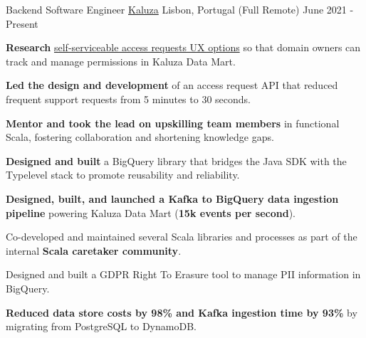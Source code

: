 
\begin{cventries}
  \vspace{-2mm}
  \cventry
    {Backend Software Engineer}
    {\href{https://www.kaluza.com/}{Kaluza}}
    {Lisbon, Portugal (Full Remote)}
    {June 2021 - Present}
    {
      \begin{cvitems}
        \item \textbf{Research} \href{https://raw.githubusercontent.com/bphenriques/curriculum-vitae/master/content/mockup_kaluza_research.png}{self-serviceable access requests UX options} so that domain owners can track and manage permissions in Kaluza Data Mart.
        \item \textbf{Led the design and development} of an access request API that reduced frequent support requests from 5 minutes to 30 seconds.
        \item \textbf{Mentor and took the lead on upskilling team members} in functional Scala, fostering collaboration and shortening knowledge gaps.
        \item \textbf{Designed and built} a BigQuery library that bridges the Java SDK with the Typelevel stack to promote reusability and reliability. 
        \item \textbf{Designed, built, and launched a Kafka to BigQuery data ingestion pipeline} powering Kaluza Data Mart (\textbf{15k events per second}).
        \item Co-developed and maintained several Scala libraries and processes as part of the internal \textbf{Scala caretaker community}.
        \item Designed and built a GDPR Right To Erasure tool to manage PII information in BigQuery.
        \item \textbf{Reduced data store costs by 98\% and Kafka ingestion time by 93\%} by migrating from PostgreSQL to DynamoDB.  %
      \end{cvitems}
      \vspace{4mm}
    }


\end{cventries}
